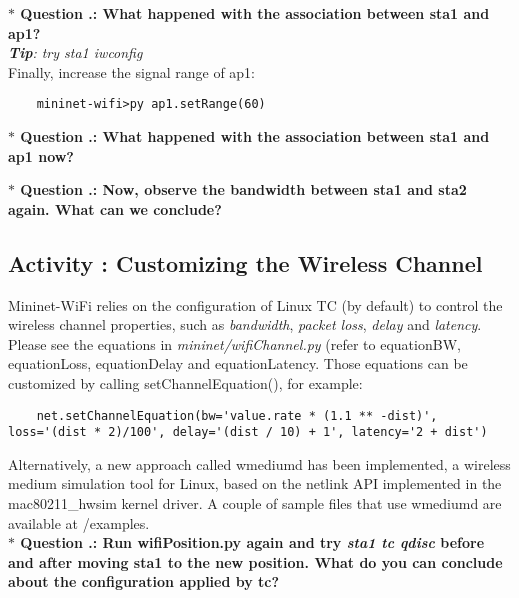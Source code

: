 \noindent \textbf{$\ast$ Question \themycounter.\thequestion{}: What happened with the association between sta1 and ap1?}
\\\textit{\textbf{Tip}: try sta1 iwconfig}
\\

\noindent Finally, increase the signal range of ap1:
\begin{verbatim}
    mininet-wifi>py ap1.setRange(60)
\end{verbatim}


\noindent \textbf{$\ast$ Question \themycounter.\thequestion{}: What happened with the association between sta1 and ap1 now?}

\noindent \textbf{$\ast$ Question \themycounter.\thequestion{}: Now, observe the bandwidth between sta1 and sta2 again. 
What can we conclude?  }


\setcounter{question}{1}
\subsection{Activity \themycounter{}: Customizing the Wireless Channel}
	
Mininet-WiFi relies on the configuration of Linux TC (by default) to
control the wireless channel properties, such as \textit{bandwidth}, \textit{packet loss}, \textit{delay} and \textit{latency}. Please see the equations in \textit{mininet/wifiChannel.py} (refer to equationBW, equationLoss, equationDelay and equationLatency. Those equations can be customized by calling setChannelEquation(), for example:

\begin{verbatim}
    net.setChannelEquation(bw='value.rate * (1.1 ** -dist)', loss='(dist * 2)/100', delay='(dist / 10) + 1', latency='2 + dist')
\end{verbatim}

Alternatively, a new approach called wmediumd has been implemented, a wireless medium simulation tool for Linux, based on the netlink API implemented in the mac80211\_hwsim kernel driver. A couple of sample files that use wmediumd are available at /examples.\\

\noindent \textbf{$\ast$ Question \themycounter.\thequestion{}: Run wifiPosition.py again and try \textit{sta1 tc qdisc} before and after moving sta1 to the new position. What do you can conclude about the configuration applied by tc?}
\\


